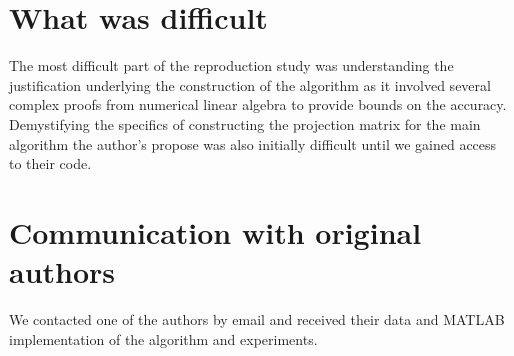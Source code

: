 \section*{What was difficult}

The most difficult part of the reproduction study was understanding the justification underlying the construction of the algorithm as it involved several complex proofs from numerical linear algebra to provide bounds on the accuracy.
Demystifying the specifics of constructing the projection matrix for the main algorithm the author's propose was also initially difficult until we gained access to their code.

\section*{Communication with original authors}

We contacted one of the authors by email and received their data and MATLAB implementation of the algorithm and experiments.
